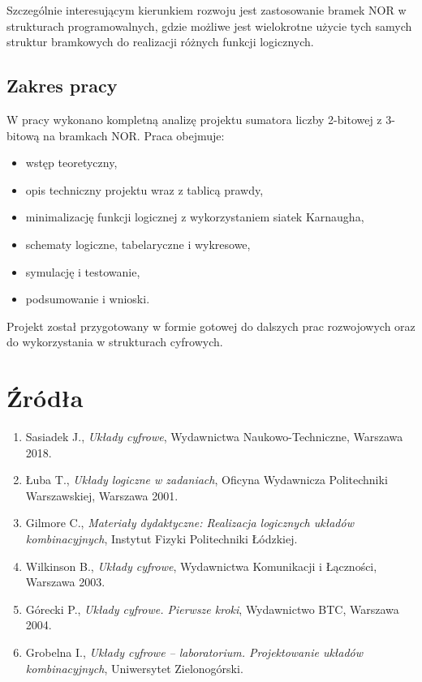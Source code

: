 \documentclass[11pt]{article}
\begin{document}
Szczególnie interesującym kierunkiem rozwoju jest zastosowanie bramek NOR w strukturach programowalnych, gdzie możliwe jest wielokrotne użycie tych samych struktur bramkowych do realizacji różnych funkcji logicznych.

\subsection{Zakres pracy}

W pracy wykonano kompletną analizę projektu sumatora liczby 2-bitowej z 3-bitową na bramkach NOR. Praca obejmuje:
\begin{itemize}
    \item wstęp teoretyczny,
    \item opis techniczny projektu wraz z tablicą prawdy,
    \item minimalizację funkcji logicznej z wykorzystaniem siatek Karnaugha,
    \item schematy logiczne, tabelaryczne i wykresowe,
    \item symulację i testowanie,
    \item podsumowanie i wnioski.
\end{itemize}

Projekt został przygotowany w formie gotowej do dalszych prac rozwojowych oraz do wykorzystania w strukturach cyfrowych.

\section{Źródła}

\begin{enumerate}
    \item Sasiadek J., \textit{Układy cyfrowe}, Wydawnictwa Naukowo-Techniczne, Warszawa 2018.
    \item Łuba T., \textit{Układy logiczne w zadaniach}, Oficyna Wydawnicza Politechniki Warszawskiej, Warszawa 2001.
    \item Gilmore C., \textit{Materiały dydaktyczne: Realizacja logicznych układów kombinacyjnych}, Instytut Fizyki Politechniki Łódzkiej.
    \item Wilkinson B., \textit{Układy cyfrowe}, Wydawnictwa Komunikacji i Łączności, Warszawa 2003.
    \item Górecki P., \textit{Układy cyfrowe. Pierwsze kroki}, Wydawnictwo BTC, Warszawa 2004.
    \item Grobelna I., \textit{Układy cyfrowe -- laboratorium. Projektowanie układów kombinacyjnych}, Uniwersytet Zielonogórski.
\end{enumerate}
\end{document}
